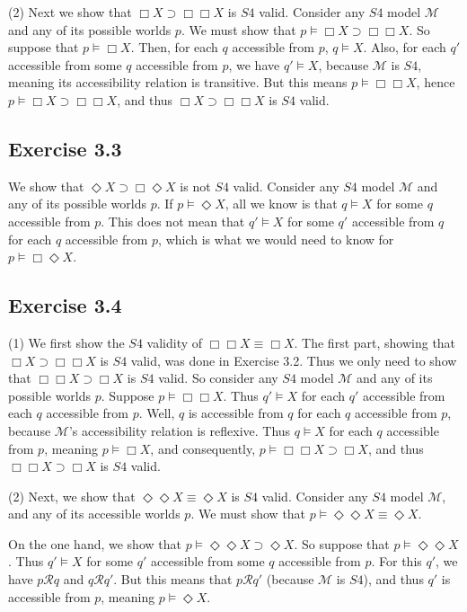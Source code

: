 \documentclass{article}
\theoremstyle{definition}
\begin{document}
(2) Next we show that $\Box X\supset\Box\Box X$ is $S4$ valid. Consider any $S4$ model $\mathcal{M}$ and any of its possible 
worlds $p$. We must show that $p\vDash\Box X\supset\Box\Box X$. So suppose that 
$p\vDash\Box X$. Then, for each $q$ accessible from $p$, $q\vDash X$. Also, for each $q'$ accessible from some $q$ accessible from 
$p$, we have $q'\vDash X$, because $\mathcal{M}$ is $S4$, meaning its accessibility relation is transitive. But this means 
$p\vDash\Box\Box X$, hence $p\vDash\Box X\supset\Box\Box X$, and thus 
$\Box X\supset\Box\Box X$ is $S4$ valid.

\subsection*{Exercise 3.3}
We show that $\Diamond X\supset\Box\Diamond X$ is not $S4$ valid. Consider any $S4$ model $\mathcal{M}$ and any of its 
possible worlds $p$. If $p\vDash\Diamond X$, all we know is that $q\vDash X$ for some 
$q$ accessible from $p$. This does not mean that $q'\vDash X$ for some $q'$ accessible from $q$ for each $q$ accessible from 
$p$, which is what we would need to know for $p\vDash\Box\Diamond X$.

\subsection*{Exercise 3.4}
(1) We first show the $S4$ validity of $\Box\Box X\equiv\Box X$. The first part, showing that 
$\Box X\supset\Box\Box X$ is $S4$ valid, was done in Exercise 3.2. Thus we only need to show that 
$\Box\Box X\supset\Box X$ is $S4$ valid. So consider any $S4$ model $\mathcal{M}$ and any of its possible worlds $p$.
Suppose $p\vDash\Box\Box X$. Thus $q'\vDash X$ for each $q'$ accessible from each $q$ accessible from $p$. Well, 
$q$ is accessible from $q$ for each $q$ accessible from $p$, because $\mathcal{M}$'s accessibility relation is 
reflexive. Thus $q\vDash X$ for each $q$ accessible from $p$, meaning $p\vDash\Box X$, and consequently, 
$p\vDash\Box\Box X\supset\Box X$, and thus
$\Box\Box X\supset\Box X$ is $S4$ valid.

(2) Next, we show that $\Diamond\Diamond X\equiv\Diamond X$ is $S4$ valid. Consider any $S4$ model 
$\mathcal{M}$, and any of its accessible worlds $p$. We must show that 
$p\vDash\Diamond\Diamond X\equiv\Diamond X$. 

On the one hand, we show that $p\vDash\Diamond\Diamond X\supset\Diamond X$. So suppose that 
$p\vDash\Diamond\Diamond X$. Thus $q'\vDash X$ for some $q'$ accessible from some $q$ accessible from $p$. For this 
$q'$, we have $p\mathcal{R}q$ and $q\mathcal{R}q'$. But this means that $p\mathcal{R}q'$ (because $\mathcal{M}$ is 
$S4$), and thus $q'$ is accessible from $p$, meaning $p\vDash\Diamond X$.
\end{document}
